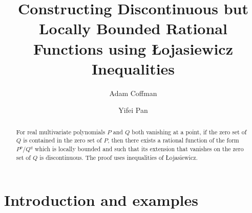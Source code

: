 \documentclass[12pt]{amsart}
\title[Constructing Bounded Rational Functions]{Constructing Discontinuous but Locally Bounded Rational Functions using \L ojasiewicz Inequalities}
\author{Adam Coffman}\thanks{ORCID 0000-0002-1437-7525}
\author{Yifei Pan}
\theoremstyle{definition}
\theoremstyle{remark}
\numberwithin{equation}{section}
\begin{document}
\begin{abstract}
    For real multivariate polynomials $P$ and $Q$ both vanishing at a point, if the zero set of $Q$ is contained in the zero set of $P$, then there exists a rational function of the form $P^{p}/Q^{q}$ which is locally bounded and such that its extension that vanishes on the zero set of $Q$ is discontinuous.  The proof uses inequalities of \L ojasiewicz.
\end{abstract}

\maketitle

%


  
\section{Introduction and examples}\label{ir}
\end{document}
